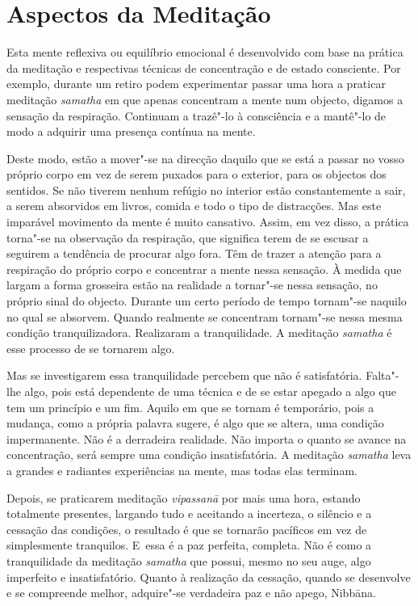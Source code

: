 \section{Aspectos da Meditação}

Esta mente reflexiva ou equilíbrio emocional é desenvolvido com base na prática
da meditação e respectivas técnicas de concentração e de estado consciente. Por
exemplo, durante um retiro podem experimentar passar uma hora a praticar
meditação \emph{samatha} em que apenas concentram a mente num objecto, digamos a
sensação da respiração. Continuam a trazê"-lo à consciência e a mantê"-lo de modo a
adquirir uma presença contínua na mente.

Deste modo, estão a mover"-se na direcção daquilo que se está a passar no vosso
próprio corpo em vez de serem puxados para o exterior, para os objectos dos
sentidos. Se não tiverem nenhum refúgio no interior estão constantemente a sair,
a serem absorvidos em livros, comida e todo o tipo de distracções. Mas este
imparável movimento da mente é muito cansativo. Assim, em vez disso, a prática
torna"-se na observação da respiração, que significa terem de se escusar a
seguirem a tendência de procurar algo fora. Têm de trazer a atenção para a
respiração do próprio corpo e concentrar a mente nessa sensação. À medida que
largam a forma grosseira estão na realidade a tornar"-se nessa sensação, no
próprio sinal do objecto. Durante um certo período de tempo tornam"-se naquilo 
no qual se absorvem. Quando realmente se concentram tornam"-se nessa mesma condição
tranquilizadora. Realizaram a tranquilidade. A meditação \emph{samatha} é esse
processo de se tornarem algo. 

Mas se investigarem essa tranquilidade percebem que não é satisfatória. Falta"-lhe 
algo, pois está dependente de uma técnica e de se estar apegado a algo que tem um 
princípio e um fim. Aquilo em que se tornam é temporário, pois a mudança, como a 
própria palavra sugere, é algo que se altera, uma condição impermanente. Não é a 
derradeira realidade. Não importa o quanto se avance na concentração, será sempre uma
condição insatisfatória. A meditação \emph{samatha} leva a grandes e radiantes
experiências na mente, mas todas elas terminam.

Depois, se praticarem meditação \emph{vipassanā} por mais uma hora, estando
totalmente presentes, largando tudo e aceitando a incerteza, o silêncio e a
cessação das condições, o resultado é que se tornarão pacíficos em vez de
simplesmente tranquilos. E~essa é a paz perfeita, completa. Não é como a
tranquilidade da meditação \emph{samatha} que possui, mesmo no seu auge, algo
imperfeito e insatisfatório. Quanto à realização da cessação, quando se
desenvolve e se compreende melhor, adquire"-se verdadeira paz e não apego,
Nibbāna.

